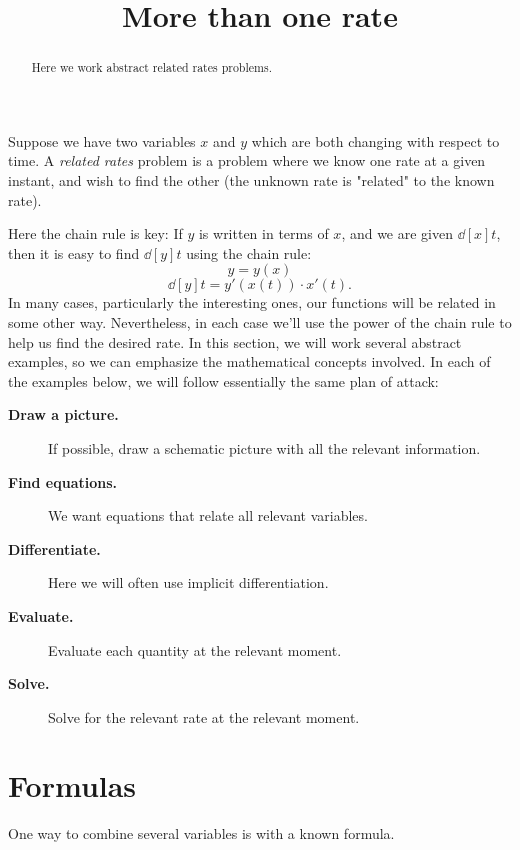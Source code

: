 \documentclass{ximera}
\title[Dig-In:]{More than one rate}
\begin{document}
\begin{abstract}
  Here we work abstract related rates problems.
\end{abstract}
\maketitle


Suppose we have two variables $x$ and $y$ which are both changing with
respect to time.  A \textit{related rates} problem is a problem where
we know one rate at a given instant, and wish to find the other (the unknown rate is "related" to the known rate).

Here the chain rule is key: If $y$ is written in terms of $x$, and we
are given $\dd[x]{t}$, then it is easy to find $\dd[y]{t}$ using the
chain rule:
\[
y=y(x)
\]
\[
\dd[y]{t}=y'(x(t))\cdot x'(t).
\]
In many cases, particularly the interesting ones, our functions will
be related in some other way. Nevertheless, in each case we'll use the
power of the chain rule to help us find the desired rate. In this
section, we will work several abstract examples, so we can emphasize
the mathematical concepts involved. In each of the examples below, we
will follow essentially the same plan of attack:

\begin{description}
\item[\textbf{Draw a picture.}] If possible, draw a schematic picture
  with all the relevant information.
\item[\textbf{Find equations.}] We want equations that relate all
  relevant variables.
\item[\textbf{Differentiate.}] Here we will often use
  implicit differentiation.
\item[\textbf{Evaluate.}] Evaluate
  each quantity  at the  relevant moment. 
    \item[\textbf{Solve.}] Solve for the relevant
  rate at the relevant moment.

\end{description}


\section{Formulas}

One way to combine several variables is with a known formula.
\end{document}
